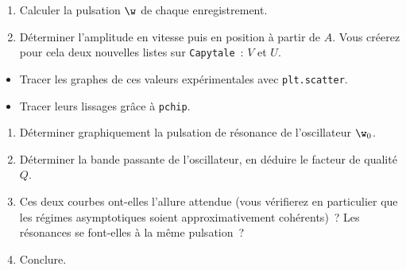 \documentclass[a4paper, 11pt, final, garamond]{book}
\begin{document}
\begin{enumerate}[label=\sqenumi, start=7]
    \item Calculer la pulsation $\w$ de chaque enregistrement.
    \item Déterminer l'amplitude en vitesse puis en position à partir de $A$.
        Vous créerez pour cela deux nouvelles listes sur \texttt{Capytale}~: $V$
        et $U$.
\end{enumerate}
\begin{itemize}
    \item Tracer les graphes de ces valeurs expérimentales avec
        \texttt{plt.scatter}.
    \item Tracer leurs lissages grâce à \texttt{pchip}.
\end{itemize}
\begin{enumerate}[label=\sqenumi, resume]
    \item Déterminer graphiquement la pulsation de résonance de l'oscillateur
        $\w_0$.
    \item Déterminer la bande passante de l'oscillateur, en déduire le facteur
        de qualité $Q$.
    \item Ces deux courbes ont-elles l'allure attendue (vous vérifierez en
        particulier que les régimes asymptotiques soient approximativement
        cohérents)~? Les résonances se font-elles à la même pulsation~?
    \item Conclure.
\end{enumerate}
\end{document}
